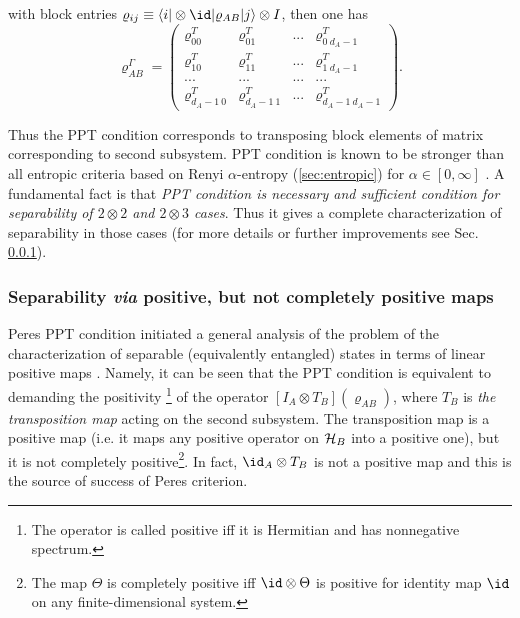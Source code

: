 \documentclass[twocolumn,aps,rmp]{revtex4}
\begin{document}
with block entries $\varrho_{ij} \equiv \langle i |\otimes \id |
\varrho_{AB} | j \rangle \otimes I$, then one has
\begin{equation}
\varrho_{AB}^{\Gamma}=\left(\begin{array}{cccc}
\varrho_{00}^{T} & \varrho_{01}^{T} & ... & \varrho_{0 \ d_{A}-1}^{T}\\
\varrho_{10}^{T} & \varrho_{11}^{T} & ... & \varrho_{1 \ d_{A}-1}^{T}\\
 ...  &  ...  & ...   & ...  \\
\varrho_{d_{A}-1 \ 0}^{T} & \varrho_{d_{A}-1 \ 1}^{T} & ... &
\varrho_{d_{A}-1  \ d_{A}-1}^{T}
\end{array} \right).
\end{equation}

Thus the PPT condition corresponds to transposing block elements of
matrix corresponding to second subsystem. PPT condition is known to be
stronger than all entropic criteria based on Renyi $\alpha$-entropy
(\ref{sec:entropic}) for $\alpha \in [0,\infty]$ \cite{VollbrechtW}. A
fundamental fact is \cite{Peres96,sep1996} that {\it PPT condition is
  necessary and sufficient condition for separability of $2 \otimes 2$
  and $2 \otimes 3$ cases}. Thus it gives a complete characterization
of separability in those cases (for more details or further
improvements see Sec.  \ref{subsubsec:maps}).


\subsubsection{Separability {\it via} positive, but not completely positive maps}
\label{subsubsec:maps}

Peres PPT condition initiated a general analysis of the problem of the
characterization of separable (equivalently entangled) states in terms
of linear positive maps \cite{sep1996}. Namely, it can be seen that
the PPT condition is equivalent to demanding the positivity
\footnote{The operator is called positive iff it is Hermitian and has
  nonnegative spectrum.} of the operator $[I_{A} \otimes
T_{B}](\varrho_{AB})$, where $T_{B}$ is {\it the transposition map}
acting on the second subsystem. The transposition map is a positive
map (i.e. it maps any positive operator on ${\cal H}_{B}$ into a
positive one), but it is not completely positive\footnote{The map
  $\Theta$ is completely positive iff $\id \otimes \Theta$ is positive
  for identity map $\id$ on any finite-dimensional system.}. In fact,
$\id_{A} \otimes T_{B}$ is not a positive map and this is the source
of success of Peres criterion.
\end{document}

